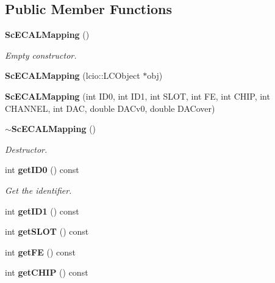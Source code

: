 \subsection*{Public Member Functions}
\begin{DoxyCompactItemize}
\item 
{\bf Sc\-E\-C\-A\-L\-Mapping} ()\label{classCALICE_1_1ScECALMapping_ae44ea6c16a16616becda36cca3fdffc6}

\begin{DoxyCompactList}\small\item\em Empty constructor. \end{DoxyCompactList}\item 
{\bfseries Sc\-E\-C\-A\-L\-Mapping} (lcio\-::\-L\-C\-Object $\ast$obj)\label{classCALICE_1_1ScECALMapping_a24f94a3f3b6e97dc7b34243f37e1a641}

\item 
{\bfseries Sc\-E\-C\-A\-L\-Mapping} (int I\-D0, int I\-D1, int S\-L\-O\-T, int F\-E, int C\-H\-I\-P, int C\-H\-A\-N\-N\-E\-L, int D\-A\-C, double D\-A\-Cv0, double D\-A\-Cover)\label{classCALICE_1_1ScECALMapping_a264bec0176d1aa28b09e77d434a648fe}

\item 
{\bf $\sim$\-Sc\-E\-C\-A\-L\-Mapping} ()\label{classCALICE_1_1ScECALMapping_a48f17616abd6ad79c8a3eb70ffa45ba6}

\begin{DoxyCompactList}\small\item\em Destructor. \end{DoxyCompactList}\item 
int {\bf get\-I\-D0} () const \label{classCALICE_1_1ScECALMapping_a93709eafceac8b30611894a05da81452}

\begin{DoxyCompactList}\small\item\em Get the identifier. \end{DoxyCompactList}\item 
int {\bfseries get\-I\-D1} () const \label{classCALICE_1_1ScECALMapping_a8e84695f1f34c58263697c8dfbf2b6fd}

\item 
int {\bfseries get\-S\-L\-O\-T} () const \label{classCALICE_1_1ScECALMapping_a5dafddd8602381312ee5eef23d2caef6}

\item 
int {\bfseries get\-F\-E} () const \label{classCALICE_1_1ScECALMapping_aef4cc956fc4fe091ca4162b6914f9677}

\item 
int {\bfseries get\-C\-H\-I\-P} () const \label{classCALICE_1_1ScECALMapping_a86e6306613f37baa93fdb527b3179971}


\end{DoxyCompactItemize}
